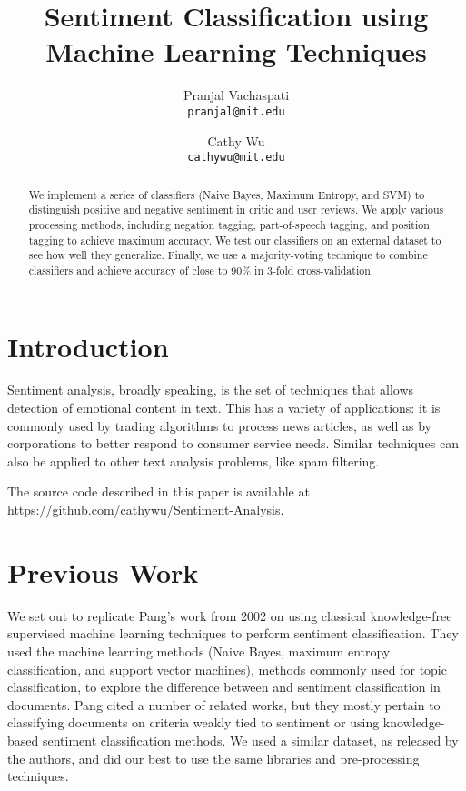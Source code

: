 \documentclass[10pt,twocolumn,letterpaper]{article}
\begin{document}
\title{Sentiment Classification using Machine Learning Techniques}

\author{Pranjal Vachaspati\\
{\tt\small pranjal@mit.edu}
\and
Cathy Wu\\
{\tt\small cathywu@mit.edu}
}

\maketitle
\thispagestyle{empty}

\begin{abstract}
We implement a series of classifiers (Naive Bayes, Maximum Entropy, and SVM) to distinguish positive and negative sentiment in critic and user reviews. We apply various processing methods, including negation tagging, part-of-speech tagging, and position tagging to achieve maximum accuracy. We test our classifiers on an external dataset to see how well they generalize. Finally, we use a majority-voting technique to combine classifiers and achieve accuracy of close to 90\% in 3-fold cross-validation.
\end{abstract}

\section{Introduction}

Sentiment analysis, broadly speaking, is the set of techniques that allows detection of emotional content in text. This has a variety of applications: it is commonly used by trading algorithms to process news articles, as well as by corporations to better respond to consumer service needs. Similar techniques can also be applied to other text analysis problems, like spam filtering.

The source code described in this paper is available at https://github.com/cathywu/Sentiment-Analysis.

\section{Previous Work}

We set out to replicate Pang’s work from 2002 on using classical knowledge-free supervised machine learning techniques to perform sentiment classification. They used the machine learning methods (Naive Bayes, maximum entropy classification, and support vector machines), methods commonly used for topic classification, to explore the difference between and sentiment classification in documents. Pang cited a number of related works, but they mostly pertain to classifying documents on criteria weakly tied to sentiment or using knowledge-based sentiment classification methods. We used a similar dataset, as released by the authors, and did our best to use the same libraries and pre-processing techniques.
\end{document}
